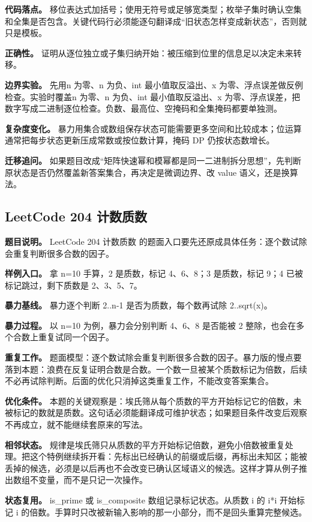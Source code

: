 \textbf{代码落点。} 移位表达式加括号；使用无符号或足够宽类型；枚举子集时确认空集和全集是否包含。关键代码行必须能逐句翻译成“旧状态怎样变成新状态”，否则就只是模板。

\textbf{正确性。} 证明从逐位独立或子集归纳开始：被压缩到位里的信息足以决定未来转移。

\textbf{边界实验。} 先用n 为零、n 为负、int 最小值取反溢出、x 为零、浮点误差做反例检查。实验时覆盖n 为零、n 为负、int 最小值取反溢出、x 为零、浮点误差，把数字写成二进制逐位检查。负数、最高位、空掩码和全集掩码都要单独测。

\textbf{复杂度变化。} 暴力用集合或数组保存状态可能需要更多空间和比较成本；位运算通常把每步状态更新压成常数或按位数计算，掩码 DP 仍按状态数增长。

\textbf{迁移追问。} 如果题目改成“矩阵快速幂和模幂都是同一二进制拆分思想”，先判断原状态是否仍然覆盖新答案集合，再决定是微调边界、改 value 语义，还是换算法。

\subsection{LeetCode 204 计数质数}

\textbf{题目说明。} LeetCode 204 计数质数 的题面入口要先还原成具体任务：逐个数试除会重复判断很多合数的因子。

\textbf{样例入口。} 拿 n=10 手算，2 是质数，标记 4、6、8；3 是质数，标记 9；4 已被标记跳过，剩下质数是 2、3、5、7。

\textbf{暴力基线。} 暴力逐个判断 2..n-1 是否为质数，每个数再试除 2..sqrt(x)。

\textbf{暴力过程。} 以 n=10 为例，暴力会分别判断 4、6、8 是否能被 2 整除，也会在多个合数上重复试同一个因子。

\textbf{重复工作。} 题面模型：逐个数试除会重复判断很多合数的因子。暴力版的慢点要落到本题：浪费在反复证明合数是合数。一个数一旦被某个质数标记为倍数，后续不必再试除判断。后面的优化只消掉这类重复工作，不能改变答案集合。

\textbf{优化条件。} 本题的关键观察是：埃氏筛从每个质数的平方开始标记它的倍数，未被标记的数就是质数。这句话必须能翻译成可维护状态；如果题目条件改变后观察不再成立，就不能继续套原来的写法。

\textbf{相邻状态。} 规律是埃氏筛只从质数的平方开始标记倍数，避免小倍数被重复处理。把这个特例继续拆开看：先标出已经确认的前缀或后缀，再标出未知区；能被丢掉的候选，必须是以后再也不会改变已确认区域语义的候选。这样才算从例子推出数组不变量，而不是只记一次操作。

\textbf{状态复用。} is\_prime 或 is\_composite 数组记录标记状态。从质数 i 的 i*i 开始标记 i 的倍数。手算时只改被新输入影响的那一小部分，而不是回头重算完整候选。

